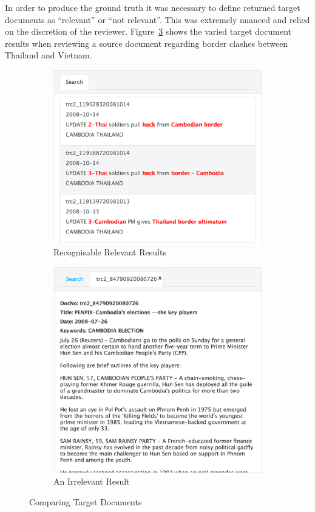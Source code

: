 \documentclass{l4proj}
\begin{document}
In order to produce the ground truth it was necessary to define returned target documents as ``relevant'' or ``not relevant''. This was extremely nuanced and relied on the discretion of the reviewer. Figure~\ref{fig:comparingtargetdocs} shows the varied target document results when reviewing a source document regarding border clashes between Thailand and Vietnam.
\begin{figure}[H]
\centering
\begin{subfigure}{.5\textwidth}
  \centering
  \includegraphics[width=.9\linewidth]{images/good_results}
  \caption{Recognisable Relevant Results}
  \label{relevant_results}
\end{subfigure}%
\begin{subfigure}{.5\textwidth}
  \centering
  \includegraphics[width=.9\linewidth]{images/bad_result}
  \caption{An Irrelevant Result}
  \label{irrelevant_result}
\end{subfigure}
\caption{Comparing Target Documents}
\label{fig:comparingtargetdocs}
\end{figure}
\end{document}
